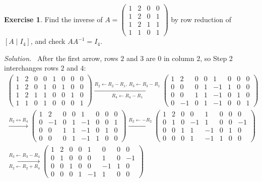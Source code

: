 \documentclass[12pt]{article}
\theoremstyle{definition}
\newtheorem{exercise}{Exercise}
\newenvironment{solution}{\par\noindent\textit{Solution.}\ }{\par\smallskip}
\begin{document}
\begin{exercise}\label{r2-dr-inverse4}
Find the inverse of \(A=\begin{pmatrix}1&2&0&0\\1&2&0&1\\1&2&1&1\\1&1&0&1\end{pmatrix}\) by row reduction of
\([A\mid I_4]\), and check \(AA^{-1}=I_4\).
\end{exercise}
\begin{solution}
After the first arrow, rows \(2\) and \(3\) are \(0\) in column \(2\), so Step 2 interchanges rows \(2\) and \(4\):
\[
\begin{gathered}
\left(\begin{array}{cccc|cccc}1&2&0&0&1&0&0&0\\1&2&0&1&0&1&0&0\\1&2&1&1&0&0&1&0\\1&1&0&1&0&0&0&1\end{array}\right)
\xrightarrow[R_4\leftarrow R_4-R_1]{R_2\leftarrow R_2-R_1,\ R_3\leftarrow R_3-R_1}
\left(\begin{array}{cccc|cccc}1&2&0&0&1&0&0&0\\0&0&0&1&-1&1&0&0\\0&0&1&1&-1&0&1&0\\0&-1&0&1&-1&0&0&1\end{array}\right)
\\
\xrightarrow{R_2\leftrightarrow R_4}
\left(\begin{array}{cccc|cccc}1&2&0&0&1&0&0&0\\0&-1&0&1&-1&0&0&1\\0&0&1&1&-1&0&1&0\\0&0&0&1&-1&1&0&0\end{array}\right)
\xrightarrow{R_2\leftarrow-R_2}
\left(\begin{array}{cccc|cccc}1&2&0&0&1&0&0&0\\0&1&0&-1&1&0&0&-1\\0&0&1&1&-1&0&1&0\\0&0&0&1&-1&1&0&0\end{array}\right)
\\
\xrightarrow[R_2\leftarrow R_2+R_4]{R_3\leftarrow R_3-R_4}
\left(\begin{array}{cccc|cccc}1&2&0&0&1&0&0&0\\0&1&0&0&0&1&0&-1\\0&0&1&0&0&-1&1&0\\0&0&0&1&-1&1&0&0\end{array}\right)

\end{gathered}\]
\end{solution}
\end{document}
